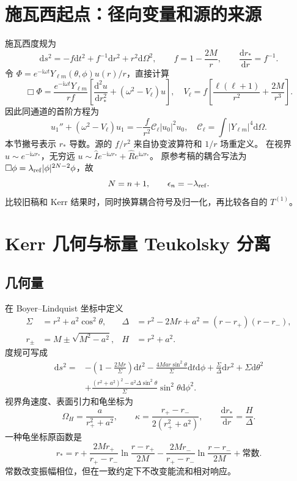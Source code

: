 \documentclass[UTF8,fontset=fandol,11pt,a4paper]{ctexart}
\newcommand{\ii}{\mathrm{i}}
\newcommand{\dd}{\mathrm{d}}
\numberwithin{equation}{section}
\begin{document}
\section{施瓦西起点：径向变量和源的来源}
施瓦西度规为
\begin{equation}
\dd s^2=-f\dd t^2+f^{-1}\dd r^2+r^2\dd\Omega^2,\qquad f=1-\frac{2M}{r},
\qquad\frac{\dd r_*}{\dd r}=f^{-1}.
\end{equation}
令 $\Phi=e^{-\ii\omega t}Y_{\ell m}(\theta,\phi)u(r)/r$，直接计算
\begin{equation}
\Box\Phi=\frac{e^{-\ii\omega t}Y_{\ell m}}{rf}
\left[\frac{\dd^2u}{\dd r_*^2}+
\left(\omega^2-V_\ell\right)u\right],
\quad V_\ell=f\left[\frac{\ell(\ell+1)}{r^2}+\frac{2M}{r^3}\right].
\end{equation}
因此同通道的首阶方程为
\begin{equation}
u_1''+(\omega^2-V_\ell)u_1
=-\frac{f}{r^2}\mathcal C_\ell |u_0|^2u_0,
\quad \mathcal C_\ell=\int |Y_{\ell m}|^4\dd\Omega.
\end{equation}
本节撇号表示 $r_*$ 导数。源的 $f/r^2$ 来自协变波算符和 $1/r$ 场重定义。
在视界 $u\sim e^{-\ii\omega r_*}$，无穷远
$u\sim\widehat I e^{-\ii\omega r_*}+\widehat R e^{\ii\omega r_*}$。
原参考稿的耦合写法为 $\Box\phi=\lambda_{\rm ref}|\phi|^{2N-2}\phi$，故
\begin{equation}N=n+1,\qquad \epsilon_n=-\lambda_{\rm ref}.\end{equation}
比较旧稿和 Kerr 结果时，同时换算耦合符号及归一化，再比较各自的 $T^{(1)}$。

\section{Kerr 几何与标量 Teukolsky 分离}
\subsection{几何量}
在 Boyer--Lindquist 坐标中定义
\begin{align}
\Sigma&=r^2+a^2\cos^2\theta,& \Delta&=r^2-2Mr+a^2=(r-r_+)(r-r_-),\\
r_\pm&=M\pm\sqrt{M^2-a^2},& H&=r^2+a^2.
\end{align}
度规可写成
\begin{align}
\dd s^2={}&-\left(1-\frac{2Mr}{\Sigma}\right)\dd t^2
-\frac{4Mar\sin^2\theta}{\Sigma}\dd t\dd\phi
+\frac{\Sigma}{\Delta}\dd r^2+\Sigma\dd\theta^2\nonumber\\
&+\frac{(r^2+a^2)^2-a^2\Delta\sin^2\theta}{\Sigma}\sin^2\theta\dd\phi^2.
\end{align}
视界角速度、表面引力和龟坐标为
\begin{equation}
\Omega_H=\frac{a}{r_+^2+a^2},\qquad
\kappa=\frac{r_+-r_-}{2(r_+^2+a^2)},\qquad
\frac{\dd r_*}{\dd r}=\frac{H}{\Delta}.
\end{equation}
一种龟坐标原函数是
\begin{equation}
r_*=r+\frac{2Mr_+}{r_+-r_-}\ln\frac{r-r_+}{2M}
-\frac{2Mr_-}{r_+-r_-}\ln\frac{r-r_-}{2M}+\text{常数}.
\end{equation}
常数改变振幅相位，但在一致约定下不改变能流和相对响应。
\end{document}
